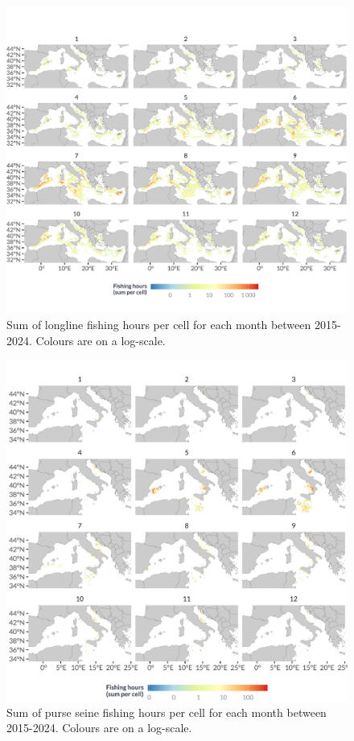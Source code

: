 \begin{figure}[H]
	\centering
	\includegraphics[width=1\linewidth, trim=0 1cm 0 1cm,clip]{Figures/plots/dll_monthly.pdf}
	\caption{Sum of longline fishing hours per cell for each month between 2015-2024. Colours are on a log-scale.}
	\label{fig:dll_monthly}
\end{figure}

\begin{figure}[H]
	\centering
	\includegraphics[width=1\linewidth, trim=0 0 0 0,clip]{Figures/plots/pss_monthly.pdf}
	\caption{Sum of purse seine fishing hours per cell for each month between 2015-2024. Colours are on a log-scale.}
	\label{fig:pss_monthly}
\end{figure}

